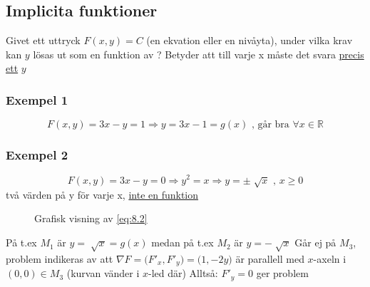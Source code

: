 \documentclass[a4paper]{article}
\let\oldsqrt\sqrt
\renewcommand*{\sqrt}[2][\ ]{\oldsqrt[#1]{#2} }
\begin{document}
\subsection{Implicita funktioner}

Givet ett uttryck \(F(x,y)=C\) (en ekvation eller en nivåyta), under vilka krav kan \(y\) lösas ut som en funktion av ? \newline
Betyder att till varje x måste det svara \underline{precis ett} \(y\)

\subsubsection{Exempel 1}
\begin{equation} \label{eq:8.1}
	F(x,y) = 3x-y = 1 \Rightarrow y = 3x-1 = g(x) \text{ , går bra } \forall x \in \mathbb{R}
\end{equation}

\subsubsection{Exempel 2}
\begin{equation} \label{eq:8.2}
	F(x,y) = 3x-y = 0 \Rightarrow y^2 = x \Rightarrow y = \pm \sqrt{x} \text{ , } x \geq 0
\end{equation}
två värden på y för varje x, \underline{inte en funktion}

\begin{figure}[ht]
  \caption{Grafisk visning av \eqref{eq:8.2}} \label{fig:8.1}
\end{figure}

På t.ex \(M_1\) är \(y = \sqrt{x} = g(x)\) medan på t.ex \(M_2\) är \(y = -\sqrt{x}\) \newline
Går ej på \(M_3\), problem indikeras av att \(\nabla F = \Big(F'_x,F'_y\Big) = \Big(1,-2y\Big)\) är parallell med \(x\)-axeln i \((0,0) \in M_3\) (kurvan vänder i \(x\)-led där) \newline
Alltså: \(F'_y = 0\) ger problem
\end{document}
